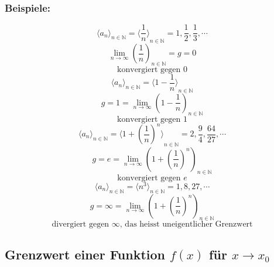 \documentclass[11pt]{amsart}
\theoremstyle{remark}
\begin{document}
\subsubsection*{Beispiele:} 
\begin{equation}
	{\langle a_n\rangle}_{n \in \mathbb{N}} ={\langle \frac {1}{n} \rangle}_{n \in \mathbb{N}} = 1, \frac{1}{2}, \frac 13, \dotsb 
\end{equation}
\begin{equation*}
 \lim_{n \to \infty} ( \frac 1n )_{n \in \mathbb{N}} = g = 0
\end{equation*}
\begin{equation*}	
	\text{konvergiert gegen } 0
\end{equation*}
\begin{equation}
	{\langle a_n\rangle}_{n \in \mathbb{N}} ={\langle 1-\frac {1}{n} \rangle}_{n \in \mathbb{N}} 
\end{equation}
\begin{equation*}
g = 1 = \lim_{n \to \infty} ( 1- \frac 1n )_{n \in \mathbb{N}}
\end{equation*}
\begin{equation*}	
	\text{konvergiert gegen } 1
\end{equation*}
\begin{equation}
	{\langle a_n\rangle}_{n \in \mathbb{N}} ={\langle 1+(\frac {1}{n})^n \rangle}_{n \in \mathbb{N}} = 2, \frac{9}{4}, \frac {64}{27}, \dotsb 
\end{equation}
\begin{equation*}
g = e = \lim_{n \to \infty} (1+ (\frac 1n)^n )_{n \in \mathbb{N}}
\end{equation*}
\begin{equation*}	
	\text{konvergiert gegen } e
\end{equation*}
\begin{equation}
	{\langle a_n\rangle}_{n \in \mathbb{N}} ={\langle n^3 \rangle}_{n \in \mathbb{N}} = 1,8,27, \dotsb 
\end{equation}
\begin{equation*}
g = \infty = \lim_{n \to \infty} (1+ (\frac 1n)^n )_{n \in \mathbb{N}}
\end{equation*}
\begin{equation*}	
	\text{divergiert gegen } \infty \text{, das heisst uneigentlicher Grenzwert}
\end{equation*}

\subsection{Grenzwert einer Funktion $f(x)$ f\"ur $x 	\to x_0$}
\end{document}
